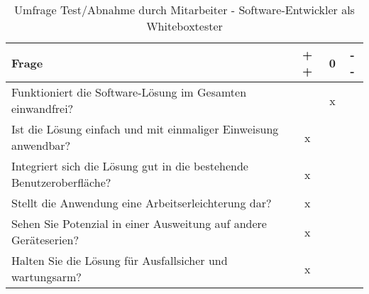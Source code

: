 \begin{table}[ht]
    \begin{center}
        \begin{tabular}{| l | c | c | c |}
            \hline
            \textbf{Frage}                                                       & \textbf{+ +} & \textbf{0} & \textbf{- -} \\
            \hline
            Funktioniert die Software-Lösung im Gesamten einwandfrei?            &             &  x          &              \\
            \hline
            Ist die Lösung einfach und mit einmaliger Einweisung anwendbar?      & x            &            &              \\
            \hline
            Integriert sich die Lösung gut in die bestehende Benutzeroberfläche? & x            &            &              \\
            \hline
            Stellt die Anwendung eine Arbeitserleichterung dar?                  & x            &            &              \\
            \hline
            Sehen Sie Potenzial in einer Ausweitung auf andere Geräteserien?     & x            &            &              \\
            \hline
            Halten Sie die Lösung für Ausfallsicher und wartungsarm?             & x             &           &              \\
            \hline
        \end{tabular}
    \end{center}
    \caption{Umfrage Test/Abnahme durch Mitarbeiter - Software-Entwickler als Whiteboxtester }
    \label{umfrage_firma_ak}
\end{table}



